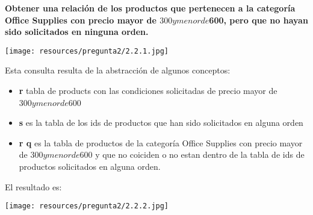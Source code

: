 \textbf{Obtener una relación de los productos que pertenecen a la categoría Office Supplies con precio mayor de $300 y menor de $600, pero que no hayan sido solicitados en ninguna orden.} \vspace{.3cm}

\begin{center}
    \texttt{[image: resources/pregunta2/2.2.1.jpg]}
\end{center}

Esta consulta resulta de la abstracción de algunos conceptos:
\begin{itemize}
    \item \textbf{r} tabla de products con las condiciones solicitadas de precio mayor de $300 y menor de $600
    \item  \textbf{s} es la tabla de los ids de productos que han sido solicitados en alguna orden
    \item  \textbf{r \vartriangleright q} es la tabla de productos de la categoría Office Supplies con precio mayor de $300 y menor de $600 y que no coiciden o no estan dentro de la tabla de ids de productos solicitados en alguna orden.
\end{itemize}

El resultado es:

\begin{center}
    \texttt{[image: resources/pregunta2/2.2.2.jpg]}
\end{center}

